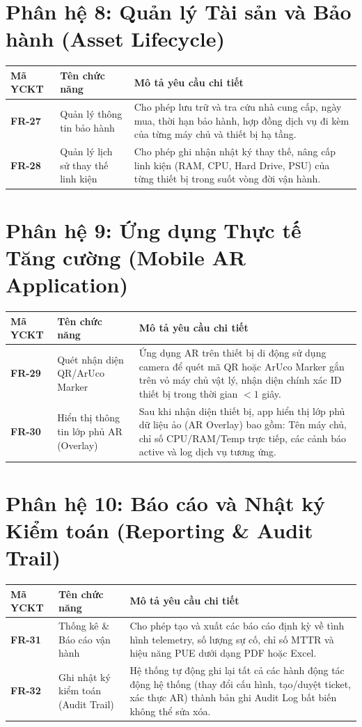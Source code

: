 \section{Phân hệ 8: Quản lý Tài sản và Bảo hành (Asset Lifecycle)}
\begin{longtable}{|p{2.5cm}|p{4cm}|p{8cm}|}
\hline
\textbf{Mã YCKT} & \textbf{Tên chức năng} & \textbf{Mô tả yêu cầu chi tiết} \\ \hline
\endhead
\textbf{FR-27} & Quản lý thông tin bảo hành & Cho phép lưu trữ và tra cứu nhà cung cấp, ngày mua, thời hạn bảo hành, hợp đồng dịch vụ đi kèm của từng máy chủ và thiết bị hạ tầng. \\ \hline
\textbf{FR-28} & Quản lý lịch sử thay thế linh kiện & Cho phép ghi nhận nhật ký thay thế, nâng cấp linh kiện (RAM, CPU, Hard Drive, PSU) của từng thiết bị trong suốt vòng đời vận hành. \\ \hline
\end{longtable}

\section{Phân hệ 9: Ứng dụng Thực tế Tăng cường (Mobile AR Application)}
\begin{longtable}{|p{2.5cm}|p{4cm}|p{8cm}|}
\hline
\textbf{Mã YCKT} & \textbf{Tên chức năng} & \textbf{Mô tả yêu cầu chi tiết} \\ \hline
\endhead
\textbf{FR-29} & Quét nhận diện QR/ArUco Marker & Ứng dụng AR trên thiết bị di động sử dụng camera để quét mã QR hoặc ArUco Marker gắn trên vỏ máy chủ vật lý, nhận diện chính xác ID thiết bị trong thời gian $< 1$ giây. \\ \hline
\textbf{FR-30} & Hiển thị thông tin lớp phủ AR (Overlay) & Sau khi nhận diện thiết bị, app hiển thị lớp phủ dữ liệu ảo (AR Overlay) bao gồm: Tên máy chủ, chỉ số CPU/RAM/Temp trực tiếp, các cảnh báo active và log dịch vụ tương ứng. \\ \hline
\end{longtable}

\section{Phân hệ 10: Báo cáo và Nhật ký Kiểm toán (Reporting \& Audit Trail)}
\begin{longtable}{|p{2.5cm}|p{4cm}|p{8cm}|}
\hline
\textbf{Mã YCKT} & \textbf{Tên chức năng} & \textbf{Mô tả yêu cầu chi tiết} \\ \hline
\endhead
\textbf{FR-31} & Thống kê \& Báo cáo vận hành & Cho phép tạo và xuất các báo cáo định kỳ về tình hình telemetry, số lượng sự cố, chỉ số MTTR và hiệu năng PUE dưới dạng PDF hoặc Excel. \\ \hline
\textbf{FR-32} & Ghi nhật ký kiểm toán (Audit Trail) & Hệ thống tự động ghi lại tất cả các hành động tác động hệ thống (thay đổi cấu hình, tạo/duyệt ticket, xác thực AR) thành bản ghi Audit Log bất biến không thể sửa xóa. \\ \hline
\end{longtable}

